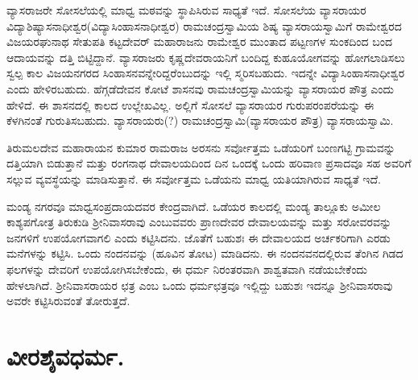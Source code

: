 ವ್ಯಾಸರಾಜರೇ ಸೋಸಲೆಯಲ್ಲಿ ಮಾಧ್ವ ಮಠವನ್ನು ಸ್ಥಾಪಿಸಿರುವ ಸಾಧ್ಯತೆ ಇದೆ. ಸೋಸಲೆಯ ವ್ಯಾಸರಾಯರ ವಿದ್ಯಾಶಿಷ್ಯಾಸನಾಧೀಶ್ವರ(ವಿದ್ಯಾಸಿಂಹಾಸನಾಧೀಶ್ವರ) ರಾಮಚಂದ್ರಸ್ವಾಮಿಯ ಶಿಷ್ಯ ವ್ಯಾಸರಾಯಸ್ವಾಮಿಗೆ ರಾಮೇಶ್ವರದ ವಿಜಯರಘುನಾಥ ಸೇತುಪತಿ ಕಟ್ಟದೇವರ್​ ಮಹಾರಾಜನು ರಾಮೇಶ್ವರ ಮುಂತಾದ ಪಟ್ಟಣಗಳ ಸುಂಕದಿಂದ ಬಂದ ಆದಾಯವನ್ನು ದತ್ತಿ ಬಿಟ್ಟಿದ್ದಾನೆ. ವ್ಯಾಸರಾಜರು ಕೃಷ್ಣದೇವರಾಯನಿಗೆ ಬಂದಿದ್ದ ಕುಹೂಯೋಗವನ್ನು ಹೋಗಲಾಡಿಸಲು ಸ್ವಲ್ಪ ಕಾಲ ವಿಜಯನಗರದ ಸಿಂಹಾಸನವನ್ನೇರಿದ್ದರೆಂಬುದನ್ನು ಇಲ್ಲಿ ಸ್ಮರಿಸಬಹುದು. ಇದನ್ನೇ ವಿದ್ಯಾಸಿಂಹಾಸನಾಧೀಶ್ವರ ಎಂದು ಹೇಳಿರಬಹುದು. ಹೆಗ್ಗಡೆದೇವನ ಕೋಟೆ ಶಾಸನವು ರಾಮಚಂದ್ರಸ್ವಾಮಿಯನ್ನು ವ್ಯಾಸರಾಯರ ಪೌತ್ರ ಎಂದು ಹೇಳಿದೆ. ಈ ಶಾಸನದಲ್ಲಿ ಕಾಲದ ಉಲ್ಲೇಖವಿಲ್ಲ. ಅಲ್ಲಿಗೆ ಸೋಸಲೆ ವ್ಯಾಸರಾಯರ ಗುರುಪರಂಪರೆಯನ್ನು ಈ ಕೆಳಗಿನಂತೆ ಗುರುತಿಸಬಹುದು. ವ್ಯಾಸರಾಯರು(?) ರಾಮಚಂದ್ರಸ್ವಾಮಿ(ವ್ಯಾಸರಾಯರ ಪೌತ್ರ)  ವ್ಯಾಸರಾಯಸ್ವಾಮಿ.

ತಿರುಮಲದೇವ ಮಹಾರಾಯನ ಕುಮಾರ ರಾಮರಾಜ ಅರಸನು ಸರ್ವೋತ್ತಮ ಒಡೆಯರಿಗೆ ಬಂಣಗಟ್ಟಿ ಗ್ರಾಮವನ್ನು ದತ್ತಿಯಾಗಿ ಬಿಡುತ್ತಾನೆ ಮತ್ತು ರಂಗನಾಥ ದೇವಾಲಯದಿಂದ ದಿನ ಒಂದಕ್ಕೆ ಒಂದು ಹರಿವಾಣ ಪ್ರಸಾದವೂ ಸಹ ಅವರಿಗೆ ಸಲ್ಲುವ ವ್ಯವಸ್ಥೆಯನ್ನು ಮಾಡಿಸುತ್ತಾನೆ. ಈ ಸರ್ವೋತ್ತಮ ಒಡೆಯನು ಮಾಧ್ವ ಯತಿಯಾಗಿರುವ ಸಾಧ್ಯತೆ ಇದೆ.

ಮಂಡ್ಯ ನಗರವೂ ಮಾಧ್ವಸಂಪ್ರದಾಯದವರ ಕೇಂದ್ರವಾಗಿದೆ. ಒಡೆಯರ ಕಾಲದಲ್ಲಿ ಮಂಡ್ಯ ತಾಲ್ಲೂಕು ಅಮೀಲ ಕಾಶ್ಯಪಗೋತ್ರ ತಿರುಕುಡಿ ಶ‍್ರೀನಿವಾಸರಾವು ಎಂಬುವವರು ಪ್ರಾಣದೇವರ ದೇವಾಲಯವನ್ನು ಮತ್ತು ಸರೋವರವನ್ನು ಜನಗಳಿಗೆ ಉಪಯೋಗವಾಗಲಿ ಎಂದು ಕಟ್ಟಿಸಿದನು. ಜೊತೆಗೆ ಬಹುಶಃ ಈ ದೇವಾಲಯದ ಅರ್ಚಕರಿಗಾಗಿ ಎರಡು ಮನೆಗಳನ್ನು ಕಟ್ಟಿಸಿ. ಒಂದು ನಂದನವನ್ನು (ಹೂವಿನ ತೋಟ) ಮಾಡಿದನು. ಈ ನಂದನವನದಲ್ಲಿರುವ ತೆಂಗಿನ ಗಿಡದ ಫಲಗಳನ್ನು ದೇವರಿಗೆ ಉಪಯೋಗಿಸಬೇಕೆಂದು, ಈ ಧರ್ಮ ನಿರಂತರವಾಗಿ ಶಾಶ್ವತವಾಗಿ ನಡೆಯಬೇಕೆಂದು ಹೇಳಲಾಗಿದೆ. ಶ‍್ರೀನಿವಾಸರಾಯರ ಛತ್ರ ಎಂಬ ಒಂದು ಧರ್ಮಛತ್ರವೂ ಇಲ್ಲಿದ್ದು ಬಹುಶಃ ಇದನ್ನೂ ಶ‍್ರೀನಿವಾಸರಾವು ಅವರೇ ಕಟ್ಟಿಸಿರುವಂತೆ ತೋರುತ್ತದೆ.


\section{ವೀರಶೈವಧರ್ಮ.}

